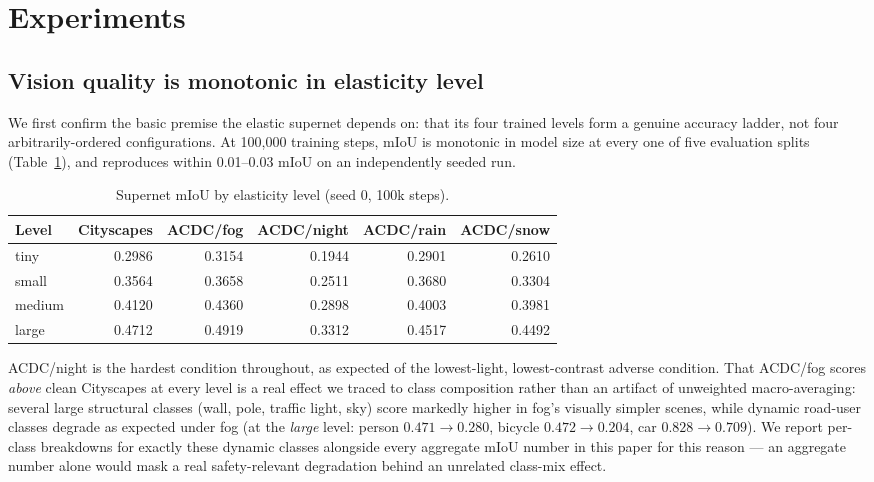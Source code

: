 \documentclass[a4paper,review,12pt]{elsarticle}
\begin{document}
\section{Experiments}
\label{sec:experiments}

\subsection{Vision quality is monotonic in elasticity level}
\label{sec:monotonic}

We first confirm the basic premise the elastic supernet depends on: that its
four trained levels form a genuine accuracy ladder, not four
arbitrarily-ordered configurations. At 100{,}000 training steps, mIoU is
monotonic in model size at every one of five evaluation splits
(Table~\ref{tab:monotonic}), and reproduces within 0.01--0.03 mIoU on an
independently seeded run.

\begin{table}[h]
\centering
\caption{Supernet mIoU by elasticity level (seed 0, 100k steps).}
\label{tab:monotonic}
\begin{tabular}{lrrrrr}
\toprule
Level & Cityscapes & ACDC/fog & ACDC/night & ACDC/rain & ACDC/snow \\
\midrule
tiny   & 0.2986 & 0.3154 & 0.1944 & 0.2901 & 0.2610 \\
small  & 0.3564 & 0.3658 & 0.2511 & 0.3680 & 0.3304 \\
medium & 0.4120 & 0.4360 & 0.2898 & 0.4003 & 0.3981 \\
large  & 0.4712 & 0.4919 & 0.3312 & 0.4517 & 0.4492 \\
\bottomrule
\end{tabular}
\end{table}

ACDC/night is the hardest condition throughout, as expected of the
lowest-light, lowest-contrast adverse condition. That ACDC/fog scores
\emph{above} clean Cityscapes at every level is a real effect we traced to
class composition rather than an artifact of unweighted macro-averaging:
several large structural classes (wall, pole, traffic light, sky) score
markedly higher in fog's visually simpler scenes, while dynamic road-user
classes degrade as expected under fog (at the \emph{large} level: person
$0.471\to0.280$, bicycle $0.472\to0.204$, car $0.828\to0.709$). We report
per-class breakdowns for exactly these dynamic classes alongside every
aggregate mIoU number in this paper for this reason --- an aggregate number
alone would mask a real safety-relevant degradation behind an unrelated
class-mix effect.
\end{document}
